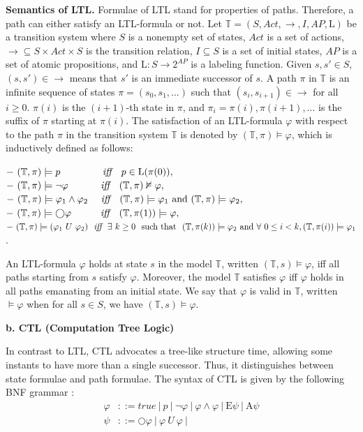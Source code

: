\noindent \textbf{Semantics of LTL.} Formulae of LTL stand for properties of paths. Therefore, a path can either satisfy an LTL-formula or not. Let $\mathbb{T} =(S, Act, \rightarrow, I, AP, \mathrm{L})$ be a transition system where $S$ is a nonempty set of states, $Act$ is a set of actions, $\rightarrow\subseteq S\times Act \times S$ is the transition relation, $I\subseteq S$ is a set of initial states, $AP$ is a set of atomic propositions, and $\mathrm{L}: S \to 2^{AP}$ is a labeling function. Given $s,s' \in S$, $(s,s') \in \rightarrow$ means that $s'$ is an immediate successor of $s$. A path $\pi$ in $\mathbb{T}$ is an infinite sequence of states $\pi=(s_0,s_1,\dots)$ such that $(s_i,s_{i+1})\in \rightarrow$ for all $i\geq 0$. $\pi(i)$ is the $(i+1)$-th state in $\pi$, and $\pi_i = \pi(i), \pi(i+1), \dots$ is the suffix of $\pi$ starting at $\pi(i)$. The satisfaction of an LTL-formula $\varphi$ with respect to the path $\pi$ in the transition system $\mathbb{T}$ is denoted by $(\mathbb{T},\pi) \models \varphi$, which is inductively defined as follows:

\noindent $-~(\mathbb{T},\pi) \models p ~~~~~~~~~~~~~\emph{iff}~~~ p\in \mathrm{L}(\pi(0)),$\\
$-~(\mathbb{T},\pi) \models \neg \varphi ~~~~~~~~~~\emph{iff}~~~ (\mathbb{T},\pi)\nvDash \varphi,$\\
$-~(\mathbb{T},\pi) \models \varphi_1 \wedge \varphi_2 ~~~~\emph{iff}~~~(\mathbb{T},\pi)\models \varphi_1~\textrm{and}~(\mathbb{T},\pi) \models \varphi_2,$ \\
$-~(\mathbb{T},\pi) \models \bigcirc\varphi ~~~~~~~~~\emph{iff}~~~ (\mathbb{T},\pi(1)) \models \varphi,$\\
$-~(\mathbb{T},\pi) \models (\varphi_1~U~\varphi_2)~~\emph{iff}~~\exists~ k \geq 0~~\textrm{such that}~~ (\mathbb{T},\pi(k)) \models \varphi_2 ~\textrm{and}~\forall~ 0\leq i < k, (\mathbb{T},\pi(i)) \models \varphi_1$.

\noindent An LTL-formula $\varphi$ holds at state $s$ in the model $\mathbb{T}$, written $(\mathbb{T},s) \models \varphi$, iff all paths starting from $s$ satisfy $\varphi$. Moreover, the model $\mathbb{T}$ satisfies $\varphi$ iff $\varphi$ holds in all paths emanating from an initial state. We say that $\varphi$ is valid in $\mathbb{T}$, written $\models \varphi$ when for all $s\in S$, we have $(\mathbb{T},s)\models \varphi$.

\noindent \textbf{b. CTL (Computation Tree Logic)}

In contrast to LTL, CTL advocates a tree-like structure time, allowing some instants to have more than a single successor. Thus, it distinguishes between state formulae and path formulae. The syntax of CTL is given by the following BNF grammar \cite{Baier2008}:
%
\begin{align*}
    \varphi & ::= true ~|~p~|~\neg \varphi~|~\varphi \wedge \varphi~|~\mathrm{E}\psi~|~\mathrm{A} \psi\\
    \psi & ::=\bigcirc \varphi ~ | ~ \varphi ~U~ \varphi~|
\end{align*}

